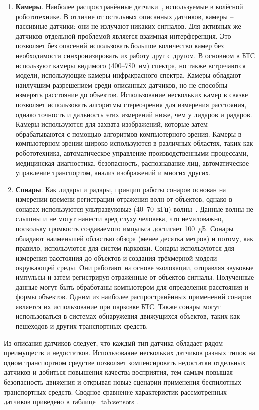 \begin{enumerate}
\item \textbf{Камеры}. Наиболее распространённые датчики~\cite{ignatious2022overview}, используемые в колёсной робототехнике. В отличие от остальных описанных датчиков, камеры -- пассивные датчики: они не излучают никаких сигналов. Для активных же датчиков отдельной проблемой является взаимная интерференция. Это позволяет без опасений использовать большое количество камер без необходимости синхронизировать их работу друг с другом. В основном в БТС используют камеры видимого (400--780~нм) спектра, но также встречаются модели, использующие камеры инфракрасного спектра. Камеры обладают наилучшим разрешением среди описанных датчиков, но не способны измерять расстояние до объектов. Использование нескольких камер в связке позволяет использовать алгоритмы стереозрения для измерения расстояния, однако точность и дальность этих измерений ниже, чем у лидаров и радаров. Камеры используются для захвата изображений, которые затем обрабатываются с помощью алгоритмов компьютерного зрения. Камеры в компьютерном зрении широко используются в различных областях, таких как робототехника, автоматическое управление производственными процессами, медицинская диагностика, безопасность, распознавание лиц, автоматическое управление транспортом, анализ изображений и многих других. 

\item \textbf{Сонары}. Как лидары и радары, принцип работы сонаров основан на измерении времени регистрации отражения волн от объектов, однако в сонарах используются ультразвуковые (40--70~кГц) волны~\cite{kleeman2016sonar}. Данные волны не слышны и не могут нанести вред слуху человека, что немаловажно, поскольку громкость создаваемого импульса достигает 100~дБ. Сонары обладают наименьшей областью обзора (менее десятка метров) и потому, как правило, используются для систем парковки. Сонары используются для измерения расстояния до объектов и создания трёхмерной модели окружающей среды. Они работают на основе эхолокации, отправляя звуковые импульсы и затем регистрируя отражённые от объектов сигналы. Полученные данные могут быть обработаны компьютером для определения расстояния и формы объектов. Одним из наиболее распространённых применений сонаров является их использование при парковке БТС. Также сонары могут использоваться в системах обнаружения движущихся объектов, таких как пешеходов и других транспортных средств.
\end{enumerate}

Из описания датчиков следует, что каждый тип датчика обладает рядом преимуществ и недостатков. Использование нескольких датчиков разных типов на одном транспортном средстве позволяет компенсировать недостатки отдельных датчиков и добиться повышения качества восприятия, тем самым повышая безопасность движения и открывая новые сценарии применения беспилотных транспортных средств. Сводное сравнение характеристик рассмотренных датчиков приведено в таблице~\cref{tab:sensors}.

